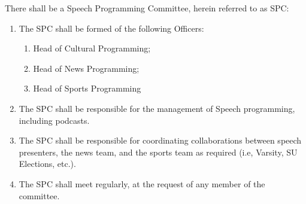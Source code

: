 \item There shall be a Speech Programming Committee, herein referred to as SPC:
\begin{enumerate}[label*=\arabic*.]
    \item The SPC shall be formed of the following Officers:
          \begin{enumerate}[label*=\arabic*.]
              \item Head of Cultural Programming;
              \item Head of News Programming;
              \item Head of Sports Programming
          \end{enumerate}
    \item The SPC shall be responsible for the management of Speech programming, including podcasts.
    \item The SPC shall be responsible for coordinating collaborations between speech presenters, the news team, and the sports team as required (i.e, Varsity, SU Elections, etc.).
    \item The SPC shall meet regularly, at the request of any member of the committee.
\end{enumerate}
